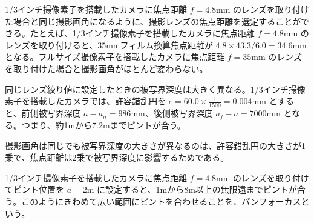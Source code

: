 \documentclass{jsarticle}
\begin{document}
1/3インチ撮像素子を搭載したカメラに焦点距離 $f = 4.8$mm のレンズを取り付けた場合と同じ撮影画角になるように、撮影レンズの焦点距離を選定することができる。たとえば、1/3インチ撮像素子を搭載したカメラに焦点距離 $f = 4.8$mm のレンズを取り付けると、35mmフィルム換算焦点距離が $4.8 \times 43.3 / 6.0 = 34.6$mm となる。フルサイズ撮像素子を搭載したカメラに焦点距離 $f = 35$mm のレンズを取り付けた場合と撮影画角がほとんど変わらない。

同じレンズ絞り値に設定したときの被写界深度は大きく異なる。1/3インチ撮像素子を搭載したカメラでは、許容錯乱円を $e = 60.0 \times \frac{1}{1500} = 0.004$mm とすると、前側被写界深度 $a - a_n = 986$mm、後側被写界深度 $a_f - a = 7000$mm となる。つまり、約1mから7.2mまでピントが合う。

撮影画角は同じでも被写界深度の大きさが異なるのは、許容錯乱円の大きさが1乗で、焦点距離は2乗で被写界深度に影響するためである。

1/3インチ撮像素子を搭載したカメラに焦点距離 $f = 4.8$mm のレンズを取り付けてピント位置を $a = 2$m に設定すると、1mから8m以上の無限遠までピントが合う。このようにきわめて広い範囲にピントを合わせることを、パンフォーカスという。
\end{document}
